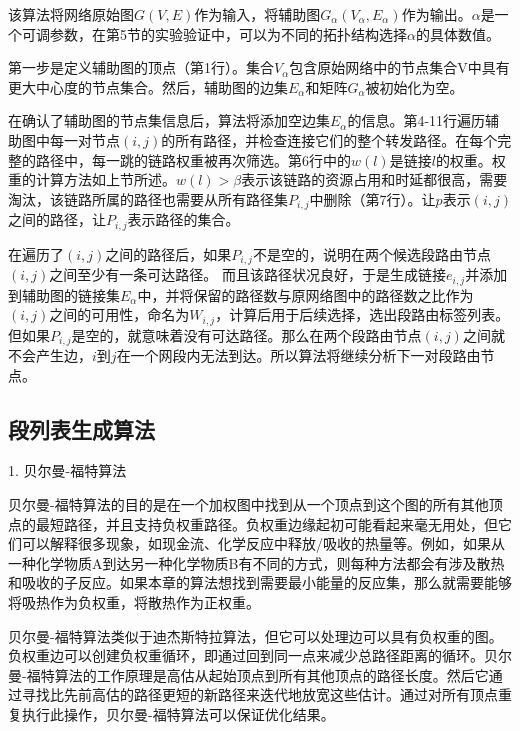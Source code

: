 该算法将网络原始图$G(V, E)$作为输入，将辅助图$G_\alpha\left(V_\alpha,E_\alpha\right)$作为输出。$\alpha$是一个可调参数，在第5节的实验验证中，可以为不同的拓扑结构选择$\alpha$的具体数值。

第一步是定义辅助图的顶点（第1行）。集合$V_\alpha$包含原始网络中的节点集合V中具有更大中心度的节点集合。然后，辅助图的边集$E_\alpha$和矩阵$G_\alpha$被初始化为空。

在确认了辅助图的节点集信息后，算法将添加空边集$E_\alpha$的信息。第4-11行遍历辅助图中每一对节点$\left(i,j\right)$的所有路径，并检查连接它们的整个转发路径。在每个完整的路径中，每一跳的链路权重被再次筛选。第6行中的$w\left(l\right)$是链接$l$的权重。权重的计算方法如上节所述。$w\left(l\right)>\beta$表示该链路的资源占用和时延都很高，需要淘汰，该链路所属的路径也需要从所有路径集$P_{i,j}$中删除（第7行）。让$p$表示$\left(i,j\right)$之间的路径，让$P_{i,j}$表示路径的集合。

在遍历了$\left(i,j\right)$之间的路径后，如果$P_{i,j}$不是空的，说明在两个候选段路由节点$\left(i,j\right)$之间至少有一条可达路径。 而且该路径状况良好，于是生成链接$e_{i,j}$并添加到辅助图的链接集$E_\alpha$中，并将保留的路径数与原网络图中的路径数之比作为$\left(i,j\right)$之间的可用性，命名为$W_{i,j}$，计算后用于后续选择，选出段路由标签列表。但如果$P_{i,j}$是空的，就意味着没有可达路径。那么在两个段路由节点$\left(i,j\right)$之间就不会产生边，$i$到$j$在一个网段内无法到达。所以算法将继续分析下一对段路由节点。

\subsection{段列表生成算法}

1. 贝尔曼-福特算法

贝尔曼-福特算法的目的是在一个加权图中找到从一个顶点到这个图的所有其他顶点的最短路径，并且支持负权重路径。负权重边缘起初可能看起来毫无用处，但它们可以解释很多现象，如现金流、化学反应中释放/吸收的热量等。例如，如果从一种化学物质A到达另一种化学物质B有不同的方式，则每种方法都会有涉及散热和吸收的子反应。如果本章的算法想找到需要最小能量的反应集，那么就需要能够将吸热作为负权重，将散热作为正权重。

贝尔曼-福特算法类似于迪杰斯特拉算法，但它可以处理边可以具有负权重的图。负权重边可以创建负权重循环，即通过回到同一点来减少总路径距离的循环。贝尔曼-福特算法的工作原理是高估从起始顶点到所有其他顶点的路径长度。然后它通过寻找比先前高估的路径更短的新路径来迭代地放宽这些估计。通过对所有顶点重复执行此操作，贝尔曼-福特算法可以保证优化结果。

